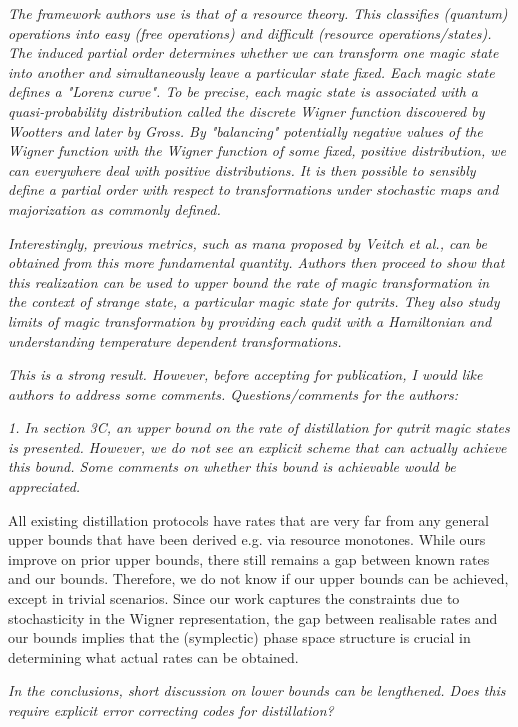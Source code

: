 \documentclass[11pt]{letter}
\begin{document}
\textit{The framework authors use is that of a resource theory. This classifies (quantum) operations into easy (free operations) and difficult (resource operations/states). The induced partial order determines whether we can transform one magic state into another and simultaneously leave a particular state fixed. Each magic state defines a "Lorenz curve". To be precise, each magic state is associated with a quasi-probability distribution called the discrete Wigner function discovered by Wootters and later by Gross. By "balancing" potentially negative values of the Wigner function with the Wigner function of some fixed, positive distribution, we can everywhere deal with positive distributions. It is then possible to sensibly define a partial order with respect to transformations under stochastic maps and majorization as commonly defined.}

\textit{Interestingly, previous metrics, such as mana proposed by Veitch et al., can be obtained from this more fundamental quantity. Authors then proceed to show that this realization can be used to upper bound the rate of magic transformation in the context of strange state, a particular magic state for qutrits. They also study limits of magic transformation by providing each qudit with a Hamiltonian and understanding temperature dependent transformations.}

\textit{This is a strong result. However, before accepting for publication, I would like authors to address some comments.
Questions/comments for the authors:}


\textit{1. In section 3C, an upper bound on the rate of distillation for qutrit magic states is presented. However, we do not see an explicit scheme that can actually achieve this bound. Some comments on whether this bound is achievable would be appreciated.}

All existing distillation protocols have rates that are very far from any general upper bounds that have been derived e.g.  via resource monotones. While ours improve on prior upper bounds, there still remains a gap between known rates and our bounds. Therefore, we do not know if our upper bounds can be achieved, except in trivial scenarios. Since our work captures the constraints due to stochasticity in the Wigner representation, the gap between realisable rates and our bounds implies that the (symplectic) phase space structure is crucial in determining what actual rates can be obtained.

\textit{In the conclusions, short discussion on lower bounds can be lengthened. Does this require explicit error correcting codes for distillation?}
\end{document}
